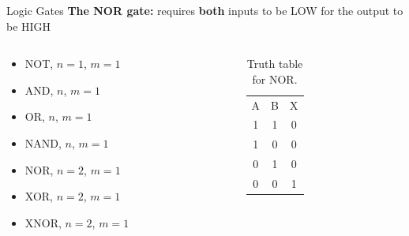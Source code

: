 \documentclass{beamer}
\begin{document}
\begin{frame}{Logic Gates}
\textbf{The NOR gate:} requires \textbf{both} inputs to be LOW for the output to be HIGH \\ \vspace{0.5cm}
\begin{columns}[T]
\begin{column}{0.5\textwidth}
\begin{itemize}
\item \alert{NOT, $n=1$, $m=1$}
\item \alert{AND, $n$, $m=1$}
\item \alert{OR, $n$, $m=1$}
\item \alert{NAND, $n$, $m=1$}
\item \alert{NOR, $n=2$, $m=1$}
\item XOR, $n=2$, $m=1$
\item XNOR, $n=2$, $m=1$
\end{itemize}
\end{column}
\begin{column}{0.5\textwidth}
\begin{table}
\begin{tabular}{c c c}
A & B & X \\
1 & 1 & 0 \\
1 & 0 & 0 \\
0 & 1 & 0 \\
0 & 0 & 1
\end{tabular}
\caption{\label{tab:NOR} Truth table for NOR.}
\end{table}
\end{column}
\end{columns}
\end{frame}
\end{document}
